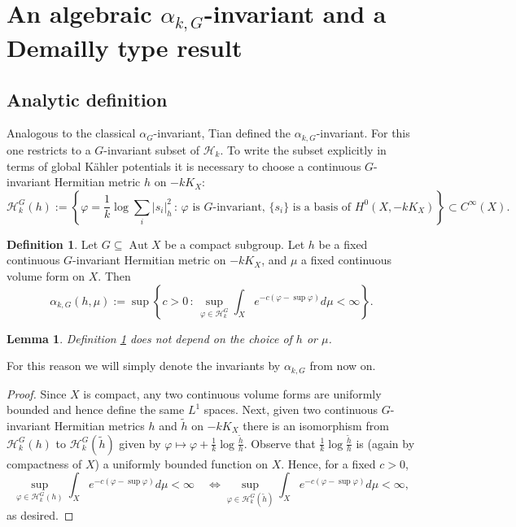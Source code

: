 \documentclass{article}
\newcommand\cH{{\mathcal H}}
\renewcommand{\>}{\rightarrow}
\DeclareMathOperator{\Aut}{Aut}
\theoremstyle{plain}
\newtheorem{lemma}[theorem]{Lemma}
\theoremstyle{definition}
\newtheorem{definition}[theorem]{Definition}
\def\K{K\"ahler }
\newcommand{\bpf}{\begin{proof}}
\newcommand{\epf}{\end{proof}}
\newcommand{\blem}{\begin{lemma}}
\newcommand{\elem}{\end{lemma}}
\def\lb#1{\label{#1}}
\begin{document}
\section{An algebraic $\alpha_{k,G}$-invariant and a Demailly
 type result}
\lb{DemaillySec}


\subsection{Analytic definition}

Analogous to the classical $\alpha_G$-invariant, Tian \cite[p. 128]{Tian90} defined the $\alpha_{k,G}$-invariant. %
For this one restricts to a $G$-invariant 
subset of $\cH_k$. To write the subset explicitly in terms of global
\K potentials it is necessary to choose a continuous $G$-invariant 
Hermitian metric $h$ on $-kK_X$:
\begin{equation}
\label{H_k^G definition}
\cH_k^{G}(h):=
\left\{\varphi=\frac{1}{k}\log\sum_i|s_i|_{h}^2\,:\,\varphi\text{ is $G$-invariant, $\{s_i\}$ is a basis of $H^0(X,-kK_X)$}\right\}\subset C^\infty(X).
\end{equation}


\begin{definition}
\lb{alphakGhmuDef}
    Let $G\subseteq\Aut X$ be a compact subgroup. 
    Let $h$ be a fixed continuous $G$-invariant Hermitian metric 
on $-kK_X$, and $\mu$ a fixed continuous volume form on $X$. Then
$$
\alpha_{k,G}(h,\mu):=\sup
\left\{c>0\,:\,\sup_{\varphi\in \cH_k^G}\int_Xe^{-c(\varphi-\sup\varphi)}d\mu<\infty\right\}.
$$
\end{definition}

\blem
\lb{DefhmuLem}
Definition \ref{alphakGhmuDef} does not depend 
on the choice of $h$ or $\mu$.
\elem
For this reason we will simply denote the invariants by $\alpha_{k,G}$
from now on. 

\bpf
Since $X$ is compact, any two continuous volume forms are uniformly bounded
and hence define the same $L^1$ spaces. Next, given two continuous
$G$-invariant Hermitian metrics $h$ and $\tilde h$ on $-kK_X$ 
there is an isomorphism
from $\cH_k^G(h)$ to $\cH_k^G(\tilde h)$ given by 
$
\varphi\mapsto \varphi+\frac1k\log\frac{\tilde h}h.
$
Observe that $\frac1k\log\frac{\tilde h}h$ is (again by compactness of $X$)
a uniformly bounded function on $X$. Hence, for a fixed $c>0$, 
$$
\sup_{\varphi\in \cH_k^G(h)}\int_Xe^{-c(\varphi-\sup\varphi)}d\mu<\infty
\quad \Leftrightarrow 
\sup_{\varphi\in \cH_k^G(\tilde h)}\int_Xe^{-c(\varphi-\sup\varphi)}d\mu<\infty,
$$
as desired.
\epf
\end{document}
